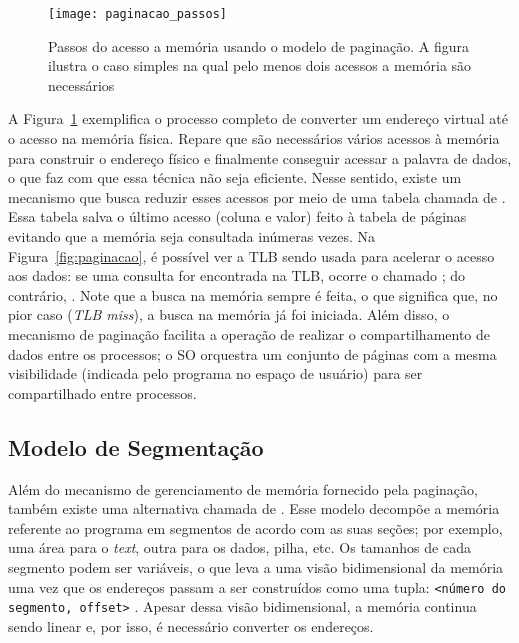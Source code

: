 \begin{figure}[!h]
  \centering
  \texttt{[image: paginacao\_passos]} 
	\caption[Passos do acesso a memória usando o modelo de paginação.]{Passos do acesso a memória usando o modelo de paginação. A figura ilustra o caso simples na qual pelo menos dois acessos a memória são necessários}
  \label{fig:passos_paginacao}
\end{figure}


A Figura~\ref{fig:passos_paginacao} exemplifica o processo completo de
converter um endereço virtual até o acesso na memória física. Repare que são
necessários vários acessos à memória para construir o endereço físico e
finalmente conseguir acessar a palavra de dados, o que faz com que essa técnica
não seja eficiente.  Nesse sentido, existe um mecanismo que busca reduzir esses
acessos por meio de uma tabela chamada de . Essa tabela salva o último acesso (coluna e valor) feito à
tabela de páginas evitando que a memória seja consultada inúmeras vezes. Na
Figura~\ref{fig:paginacao}, é possível ver a TLB sendo usada para acelerar o
acesso aos dados: se uma consulta for encontrada na TLB, ocorre o chamado
; do contrário, . Note que a busca na memória sempre é feita, o que significa
que, no pior caso (\emph{TLB miss}), a busca na memória já foi iniciada. Além
disso, o mecanismo de paginação facilita a operação de realizar o
compartilhamento de dados entre os processos; o SO orquestra um conjunto de
páginas com a mesma visibilidade (indicada pelo programa no espaço de usuário)
para ser compartilhado entre processos.

\subsection{Modelo de Segmentação}
\label{sec:segmentacao}

Além do mecanismo de gerenciamento de memória fornecido pela paginação, também
existe uma alternativa chamada de . Esse modelo
decompõe a memória referente ao programa em segmentos de acordo com as suas
seções; por exemplo, uma área para o \textit{text}, outra para os dados,
pilha, etc. Os tamanhos de cada segmento podem ser variáveis, o que
leva a uma visão bidimensional da memória uma vez que os endereços passam a ser
construídos como uma tupla: \texttt{<número do segmento, offset>}
\citep{silberschatz}. Apesar dessa visão bidimensional, a memória continua
sendo linear e, por isso, é necessário converter os endereços.

